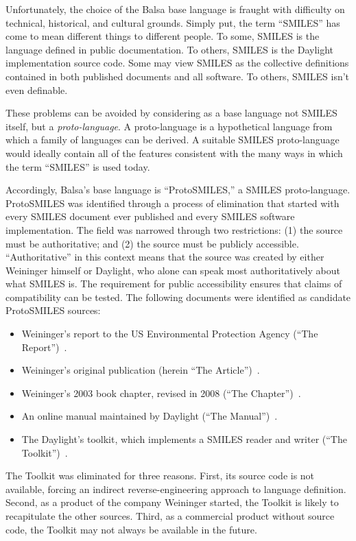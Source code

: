 \documentclass{article}
\begin{document}
Unfortunately, the choice of the Balsa base language is fraught with difficulty on technical, historical, and cultural grounds. Simply put, the term \enquote{SMILES} has come to mean different things to different people. To some, SMILES is the language defined in public documentation. To others, SMILES is the Daylight implementation source code. Some may view SMILES as the collective definitions contained in both published documents and all software. To others, SMILES isn't even definable.

These problems can be avoided by considering as a base language not SMILES itself, but a \textit{proto-language}. A proto-language is a hypothetical language from which a family of languages can be derived. A suitable SMILES proto-language would ideally contain all of the features consistent with the many ways in which the term \enquote{SMILES} is used today.

Accordingly, Balsa's base language is \enquote{ProtoSMILES,} a SMILES proto-language. ProtoSMILES was identified through a process of elimination that started with every SMILES document ever published and every SMILES software implementation. The field was narrowed through two restrictions: (1) the source must be authoritative; and (2) the source must be publicly accessible. \enquote{Authoritative} in this context means that the source was created by either Weininger himself or Daylight, who alone can speak most authoritatively about what SMILES is. The requirement for public accessibility ensures that claims of compatibility can be tested. The following documents were identified as candidate ProtoSMILES sources:

\begin{itemize}
    \item Weininger's report to the US Environmental Protection Agency (\enquote{The Report})~\cite{anderson:1987}.
    \item Weininger's original publication (herein \enquote{The Article})~\cite{weininger:1988}.
    \item Weininger's 2003 book chapter, revised in 2008 (\enquote{The Chapter})~\cite{weininger:2003}.
    \item An online manual maintained by Daylight (\enquote{The Manual})~\cite{daylightTheory}.
    \item The Daylight's toolkit, which implements a SMILES reader and writer (\enquote{The Toolkit})~\cite{daylightToolkit}.
\end{itemize}

The Toolkit was eliminated for three reasons. First, its source code is not available, forcing an indirect reverse-engineering approach to language definition. Second, as a product of the company Weininger started, the Toolkit is likely to recapitulate the other sources. Third, as a commercial product without source code, the Toolkit may not always be available in the future.
\end{document}
